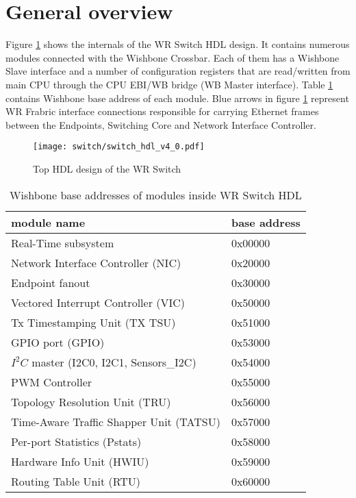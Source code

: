 \section{General overview}

Figure \ref{fig:switch_top} shows the internals of the WR Switch HDL
design. It contains numerous modules connected with the Wishbone Crossbar.
Each of them has a Wishbone Slave interface and a number of configuration
registers that are read/written from main CPU through the CPU EBI/WB bridge (WB
Master interface). Table \ref{tab:gov:wb_base} contains Wishbone base address of
each module. Blue arrows
in figure \ref{fig:switch_top} represent WR Frabric interface connections
responsible for carrying Ethernet frames between the Endpoints, Switching Core
and Network Interface \linebreak Controller.

\begin{figure}[ht]
  \begin{center}
    \texttt{[image: switch/switch\_hdl\_v4\_0.pdf]}
    \caption{Top HDL design of the WR Switch}
    \label{fig:switch_top}
  \end{center}
\end{figure}

\begin{table}
  \begin{center}
  \begin{tabular}{|l|l|}
    \hline
    module name & base address\\
    \hline \hline
    Real-Time subsystem & 0x00000\\
    Network Interface Controller (NIC) & 0x20000\\
    Endpoint fanout & 0x30000\\
    Vectored Interrupt Controller (VIC) & 0x50000\\
    Tx Timestamping Unit (TX TSU) & 0x51000\\
    GPIO port (GPIO)  & 0x53000\\
    $I^2C$ master (I2C0, I2C1, Sensors\_I2C) & 0x54000\\
    PWM Controller & 0x55000\\
    Topology Resolution Unit (TRU) & 0x56000\\
    Time-Aware Traffic Shapper Unit (TATSU) & 0x57000\\
    Per-port Statistics (Pstats) & 0x58000\\
    Hardware Info Unit (HWIU) & 0x59000\\
    Routing Table Unit (RTU) & 0x60000\\
    \hline
  \end{tabular}
  \caption{Wishbone base addresses of modules inside WR Switch HDL}
  \label{tab:gov:wb_base}
  \end{center}
\end{table}
